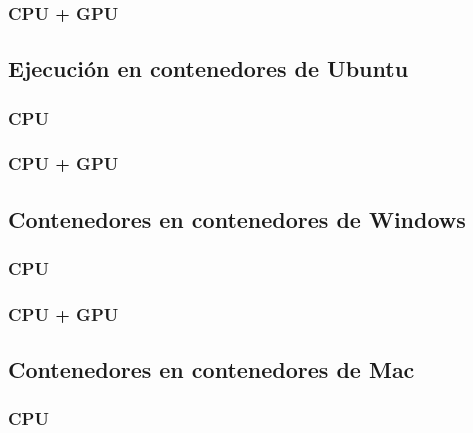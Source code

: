 \subsubsection{CPU + GPU}

\subsection{Ejecución en contenedores de Ubuntu}
\subsubsection{CPU}

\subsubsection{CPU + GPU}

\subsection{Contenedores en contenedores de Windows}
\subsubsection{CPU}

\subsubsection{CPU + GPU}

\subsection{Contenedores en contenedores de Mac}
\subsubsection{CPU}

